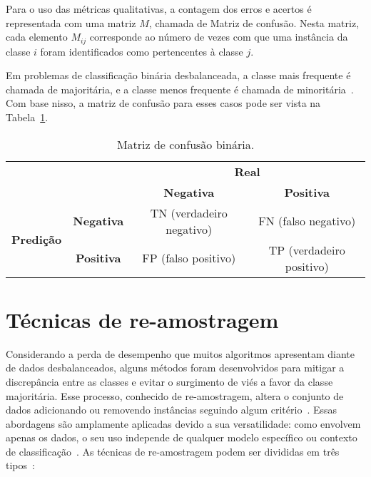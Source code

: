 Para o uso das métricas qualitativas, a contagem dos erros e acertos é representada com uma matriz \(M\), chamada de Matriz de confusão. Nesta matriz, cada elemento \(M_{ij}\) corresponde ao número de vezes com que uma instância da classe \(i\) foram identificados como pertencentes à classe \(j\).

Em problemas de classificação binária desbalanceada, a classe mais frequente é chamada de majoritária, e a classe menos frequente é chamada de minoritária~\cite{Seiffert2008,Batuwita2010}. Com base nisso, a matriz de confusão para esses casos pode ser vista na Tabela~\ref{tab:matriz-confusao}.

\begin{table}[htbp]
  \centering
  \begin{tabular}{cc|cc|}
    \cline{3-4}
    \multicolumn{2}{c|}{\multirow{2}{*}{}}                   & \multicolumn{2}{c|}{\textbf{Real}}                                                                                \\ \cline{3-4}
    \multicolumn{2}{c|}{}                                    & \multicolumn{1}{c|}{\textbf{Negativa}} & \textbf{Positiva}                                                        \\ \hline
    \multicolumn{1}{|c|}{\multirow{2}{*}{\textbf{Predição}}} & \textbf{Negativa}                      & \multicolumn{1}{c|}{TN (verdadeiro negativo)} & FN (falso negativo)      \\ \cline{2-4}
    \multicolumn{1}{|c|}{}                                   & \textbf{Positiva}                      & \multicolumn{1}{c|}{FP (falso positivo)}      & TP (verdadeiro positivo) \\ \hline
  \end{tabular}
  \caption{Matriz de confusão binária.}
  \label{tab:matriz-confusao}
\end{table}

\section{Técnicas de re-amostragem}

Considerando a perda de desempenho que muitos algoritmos apresentam diante de dados desbalanceados, alguns métodos foram desenvolvidos para mitigar a discrepância entre as classes e evitar o surgimento de viés a favor da classe majoritária. Esse processo, conhecido de re-amostragem, altera o conjunto de dados adicionando ou removendo instâncias seguindo algum critério~\cite{Chakravarthy2019}. Essas abordagens são amplamente aplicadas devido a sua versatilidade: como envolvem apenas os dados, o seu uso independe de qualquer modelo específico ou contexto de classificação~\cite{Carvalho2025}. As técnicas de re-amostragem podem ser divididas em três tipos~\cite{Haixiang2017}:

